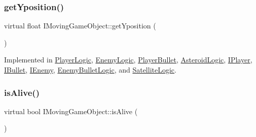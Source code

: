 \mbox{\label{class_i_moving_game_object_a153c0017219e17262a9cceddba3f61d6}} 
\subsubsection{\texorpdfstring{get\+Yposition()}{getYposition()}}
{\footnotesize\ttfamily virtual float I\+Moving\+Game\+Object\+::get\+Yposition (\begin{DoxyParamCaption}{ }\end{DoxyParamCaption})\hspace{0.3cm}{\ttfamily [pure virtual]}}



Implemented in \hyperlink{class_player_logic_a58d683bde5ee078f3b21897f2a5f4677}{Player\+Logic}, \hyperlink{class_enemy_logic_ae614032054926a4a25ed56f61111392b}{Enemy\+Logic}, \hyperlink{class_player_bullet_a240cab35d5d909366986b8661ee65d3c}{Player\+Bullet}, \hyperlink{class_asteroid_logic_a83863c5262a29b2999d04ad443622bbc}{Asteroid\+Logic}, \hyperlink{class_i_player_af72407abf2418dd9c1df50f29d51f0ef}{I\+Player}, \hyperlink{class_i_bullet_a36594de9a0c0ddd7083bca10ef5d8332}{I\+Bullet}, \hyperlink{class_i_enemy_a8011be7f510f6630250f8b9529815773}{I\+Enemy}, \hyperlink{class_enemy_bullet_logic_a0cfb3013a7613f7f6de91a6db04d03b1}{Enemy\+Bullet\+Logic}, and \hyperlink{class_satellite_logic_a1b0cb67d5bdb3cb120ec12b2be65755c}{Satellite\+Logic}.

\mbox{\label{class_i_moving_game_object_ab88f75c872699dd1376e5e83f6188e34}} 
\subsubsection{\texorpdfstring{is\+Alive()}{isAlive()}}
{\footnotesize\ttfamily virtual bool I\+Moving\+Game\+Object\+::is\+Alive (\begin{DoxyParamCaption}{ }\end{DoxyParamCaption})\hspace{0.3cm}{\ttfamily [pure virtual]}}



